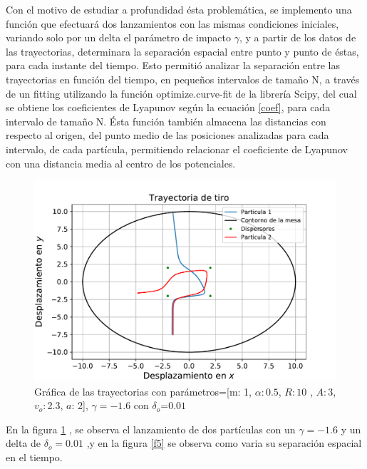 \documentclass[11pt,letterpaper,twocolumn]{article}
\begin{document}
\par 
\par 
Con el motivo de estudiar a profundidad ésta problemática, se implemento una función que efectuará dos lanzamientos con las mismas condiciones iniciales, variando solo por un delta el parámetro de impacto $\gamma$, y a partir de los datos de las trayectorias, determinara la separación espacial entre punto y punto de éstas, para cada instante del tiempo. Esto permitió analizar la separación entre las trayectorias en función del tiempo, en pequeños intervalos de tamaño N, a través de un fitting utilizando la función optimize.curve-fit de la librería Scipy, del cual se obtiene los coeficientes de Lyapunov según la ecuación \ref{coef}, para cada intervalo de tamaño N. Ésta función también almacena las distancias con respecto al origen, del punto medio de las posiciones analizadas para cada intervalo, de cada partícula, permitiendo relacionar el coeficiente de Lyapunov con una distancia media al centro de los potenciales.\\
\begin{figure}[H]
\centering 
\includegraphics[scale=0.5]{g5.pdf}
\caption{Gráfica de las trayectorias con parámetros=[m: 1, $\alpha: 0$.$5$, $R: 10$ , $A: 3$, $ v_{o}: $2.$3$, $a$: 2], $\gamma=-1.6$ con $\delta_{o}$=$0.01$}
\label{f4}
\end{figure}  
\par 
En la figura \ref{f4} , se observa el lanzamiento de dos partículas con un $\gamma=-1.6$ y un delta de $\delta_{o}=0.01$ ,y en la figura \ref{f5} se observa como varia su separación espacial en el tiempo. 
\end{document}
